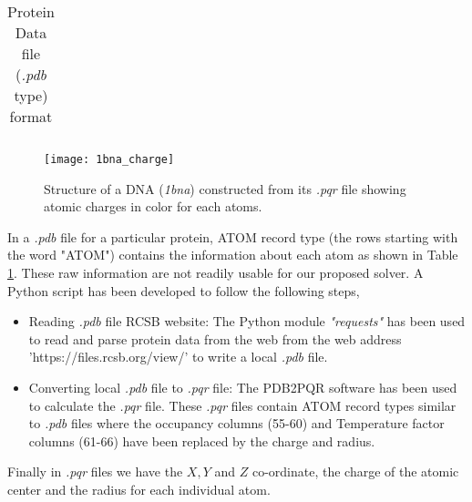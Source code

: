 \begin{table}[!ht]
\begin{tabular}{|l|l|l|l|l|}
\end{tabular}
\caption{Protein Data file (\textit{.pdb} type) format}
\label{tab:PDB_format}
\end{table}
\begin{figure}
	\centering
	\texttt{[image: 1bna\_charge]}
	\caption{Structure of a DNA (\textit{1bna}) constructed from its {\it .pqr} file showing atomic charges in color for each atoms.} 
\end{figure}

 In a \textit{.pdb} file for a particular protein, ATOM record type (the rows starting with the word "ATOM") contains the information about each atom as shown in Table \ref{tab:PDB_format}. These raw information are not readily usable for our proposed solver. A Python script has been developed to follow the following steps,
 
\begin{itemize}
 	\item Reading \textit{.pdb} file RCSB website: The Python module \textit{"requests"} has been used to read and parse protein data from the web from the web address 'https://files.rcsb.org/view/' to write a local \textit{.pdb} file. 
	\item Converting  local \textit{.pdb} file to \textit{.pqr} file: The PDB2PQR software \cite{PDB2PQR} has been used to calculate the {\it .pqr} file. These \textit{.pqr} files contain ATOM record types similar to \textit{.pdb} files where the occupancy columns (55-60) and Temperature factor columns (61-66) have been replaced by the charge and radius.     
 \end{itemize}

Finally in \textit{.pqr} files we have the $X,Y$ and $Z$ co-ordinate, the charge of the atomic center and the radius for each individual atom.  